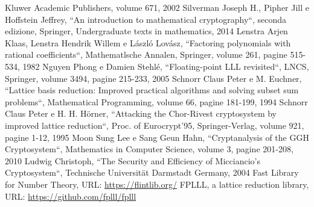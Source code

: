 \documentclass[a4paper,12pt]{report}
\theoremstyle{definition}
\begin{document}
\begin{thebibliography}{}
    Kluwer Academic Publishers, volume 671, 2002
    Silverman Joseph H., Pipher Jill e Hoffstein Jeffrey, “An introduction to mathematical cryptography“,
    seconda edizione, Springer, Undergraduate texts in mathematics, 2014
    Lenstra Arjen Klaas, Lenstra Hendrik Willem e László Lovász, 
    “Factoring polynomials with rational coefficients“, Mathematlsche Annalen, Springer, 
    volume 261, pagine 515-534, 1982
    Nguyen Phong e Damien Stehlé, “Floating-point LLL revisited“, LNCS, Springer, 
    volume 3494, pagine 215-233, 2005
    Schnorr Claus Peter e M. Euchner, 
    “Lattice basis reduction: Improved practical algorithms and solving subset sum problems“,
    Mathematical Programming, volume 66, pagine 181-199, 1994
    Schnorr Claus Peter e H. H. Hörner, 
    “Attacking the Chor-Rivest cryptosystem by improved lattice reduction“,
    Proc. of Eurocrypt'95, Springer-Verlag, volume 921, pagine 1-12, 1995
    Moon Sung Lee e Sang Geun Hahn, “Cryptanalysis of the GGH Cryptosystem“,
    Mathematics in Computer Science, volume 3, pagine 201-208, 2010
    Ludwig Christoph, “The Security and Efficiency of Micciancio’s
    Cryptosystem“, Technische Universität Darmstadt Germany, 2004
    Fast Library for Number Theory, URL: \url{https://flintlib.org/}
    FPLLL, a lattice reduction library, URL: \url{https://github.com/fplll/fplll}
   
\end{thebibliography}
% 
\end{document}
